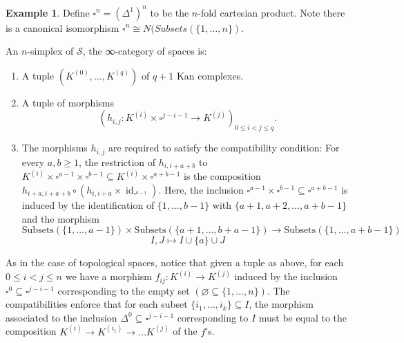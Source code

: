 \documentclass[a4paper]{amsart}
\numberwithin{figure}{section}
\theoremstyle{theorem}
\theoremstyle{definition}
\newtheorem{exam}[thm]{Example}
\newcommand{\Sp}{{\mathcal{S}}}
\DeclareMathOperator{\id}{id}
\begin{document}
\begin{exam} \label{exam:ss}
Define $\square^n = (\Delta^1)^n$ to be the $n$-fold cartesian product. Note there is a canonical isomorphism $\square^n \cong N(Subsets(\{1, \dots, n\})$.

An $n$-simplex of $\Sp$, the ∞-category of spaces is:
\begin{enumerate}
 \item A tuple $(K^{(0)}, \dots, K^{(q)})$ of $q{+}1$ Kan complexes.

 \item A tuple of morphisms
 \[ (h_{i,j}: K^{(i)} {\times} \square^{j{-}i{-}1} \to K^{(j)})_{0 \leq i < j \leq q}. \]%

 \item The morphisms $h_{i,j}$ are required to satisfy the compatibility condition: For every $a, b \geq 1$, the restriction of $h_{i,i{+}a{+}b}$ to $K^{(i)}{\times}\square^{a{-}1} {\times} \square^{b{-}1} \subseteq K^{(i)}{\times}\square^{a{+}b{-}1}$ is the composition $h_{i{+}a,i{+}a{+}b} \circ (h_{i,i{+}a} \times \id_{\square^{b{-}1}})$. Here, the inclusion $\square^{a{-}1} {\times} \square^{b{-}1} \subseteq \square^{a{+}b{-}1}$ is induced by the identification of $\{1, \dots, b{-}1\}$ with $\{a{+}1, a{+}2, \dots, a{+}b{-}1\}$ and the morphism
\[ 
 \textrm{Subsets}(\{1, \dots, a{-}1\}) \times  \textrm{Subsets}(\{a{+}1, \dots, b{+}a{-}1\}) \to \textrm{Subsets}(\{1, \dots, a{+}b{-}1\}) 
 \]
 \[
 I, J \mapsto I \cup \{a\} \cup J 
\]
 \end{enumerate}

As in the case of topological spaces, notice that given a tuple as above, for each $0 \leq i < j  \leq n$ we have a morphism $f_{ij}: K^{(i)} \to K^{(j)}$ induced by the inclusion $\square^0 \subseteq \square^{j{-}i{-}1}$ corresponding to the empty set $(\varnothing \subseteq \{1, \dots, n\})$. The compatibilities enforce that for each subset $\{i_1, \dots, i_k\} \subseteq I$, the morphism associated to the inclusion $\Delta^0 \subseteq \square^{j{-}i{-}1}$ corresponding to $I$ must be equal to the composition $K^{(i)} \to K^{(i_1)} \to \dots K^{(j)}$ of the $f$'s.


\end{exam}
\end{document}
